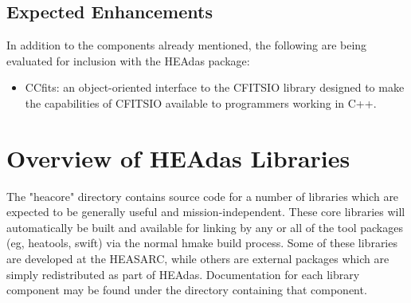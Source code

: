 \documentclass[11pt]{book}
\begin{document}
\section{Expected Enhancements}
In addition to the components already mentioned, the following are
being evaluated for inclusion with the HEAdas package:

\begin{itemize}
\item CCfits: an object-oriented interface to the CFITSIO
library designed to make the capabilities of CFITSIO
available to programmers working in C++.
\end{itemize}

\chapter{Overview of HEAdas Libraries}

The "heacore" directory contains source code for a number of
libraries which are expected to be generally useful and
mission-independent. These core libraries will automatically be
built and available for linking by any or all of the tool
packages (eg, heatools, swift) via the normal hmake build
process. Some of these libraries are developed at the HEASARC,
while others are external packages which are simply redistributed
as part of HEAdas. Documentation for each library component may
be found under the directory containing that component.
\end{document}
